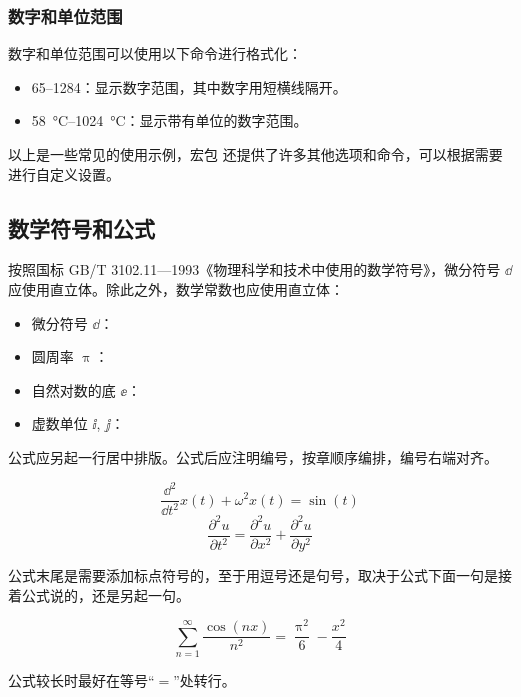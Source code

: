 \subsubsection*{数字和单位范围}

数字和单位范围可以使用以下命令进行格式化：

\begin{itemize}
    \item \numrange{65}{1284}：显示数字范围，其中数字用短横线隔开。
    \item \SIrange{58}{1024}{\degreeCelsius}：显示带有单位的数字范围。
\end{itemize}

以上是一些常见的使用示例，宏包  还提供了许多其他选项和命令，可以根据需要进行自定义设置。

\subsection{数学符号和公式}

按照国标 GB/T 3102.11—1993《物理科学和技术中使用的数学符号》，微分符号 $\dd$ 应使用直立体。除此之外，数学常数也应使用直立体：

\begin{itemize}
    \item 微分符号 $\dd$：
    \item 圆周率 $\uppi$：
    \item 自然对数的底 $\ee$：
    \item 虚数单位 $\ii$, $\jj$： 
\end{itemize}

公式应另起一行居中排版。公式后应注明编号，按章顺序编排，编号右端对齐。

\begin{equation}
    \frac{\dd^2}{\dd t^2}x(t)+\omega^2x(t)=\sin(t)
\end{equation}
\begin{equation}
    \frac{\partial^2u}{\partial t^2}=\frac{\partial^2u}{\partial x^2}+\frac{\partial^2u}{\partial y^2}
\end{equation}

公式末尾是需要添加标点符号的，至于用逗号还是句号，取决于公式下面一句是接着公式说的，还是另起一句。

\begin{equation}
    \sum_{n=1}^{\infty}\frac{\cos(nx)}{n^2}=\frac{\uppi^2}{6}-\frac{x^2}{4}
\end{equation}

公式较长时最好在等号“$=$”处转行。

